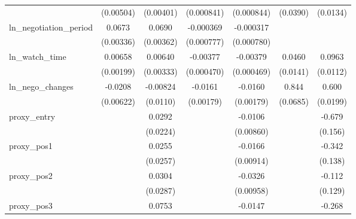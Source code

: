 {\begin{tabular}{l*{6}{c}}
            &   (0.00504)         &   (0.00401)         &  (0.000841)         &  (0.000844)         &    (0.0390)         &    (0.0134)         \\
\addlinespace
ln\_negotiation\_period&      0.0673\sym{***}&      0.0690\sym{***}&   -0.000369         &   -0.000317         &                     &                     \\
            &   (0.00336)         &   (0.00362)         &  (0.000777)         &  (0.000780)         &                     &                     \\
\addlinespace
ln\_watch\_time&     0.00658\sym{***}&     0.00640\sym{*}  &    -0.00377\sym{***}&    -0.00379\sym{***}&      0.0460\sym{***}&      0.0963\sym{***}\\
            &   (0.00199)         &   (0.00333)         &  (0.000470)         &  (0.000469)         &    (0.0141)         &    (0.0112)         \\
\addlinespace
ln\_nego\_changes&     -0.0208\sym{***}&    -0.00824         &     -0.0161\sym{***}&     -0.0160\sym{***}&       0.844\sym{***}&       0.600\sym{***}\\
            &   (0.00622)         &    (0.0110)         &   (0.00179)         &   (0.00179)         &    (0.0685)         &    (0.0199)         \\
\addlinespace
proxy\_entry &                     &      0.0292         &                     &     -0.0106         &                     &      -0.679\sym{***}\\
            &                     &    (0.0224)         &                     &   (0.00860)         &                     &     (0.156)         \\
\addlinespace
proxy\_pos1  &                     &      0.0255         &                     &     -0.0166\sym{*}  &                     &      -0.342\sym{**} \\
            &                     &    (0.0257)         &                     &   (0.00914)         &                     &     (0.138)         \\
\addlinespace
proxy\_pos2  &                     &      0.0304         &                     &     -0.0326\sym{***}&                     &      -0.112         \\
            &                     &    (0.0287)         &                     &   (0.00958)         &                     &     (0.129)         \\
\addlinespace
proxy\_pos3  &                     &      0.0753\sym{**} &                     &     -0.0147\sym{*}  &                     &      -0.268\sym{**} \\

\end{tabular}}
